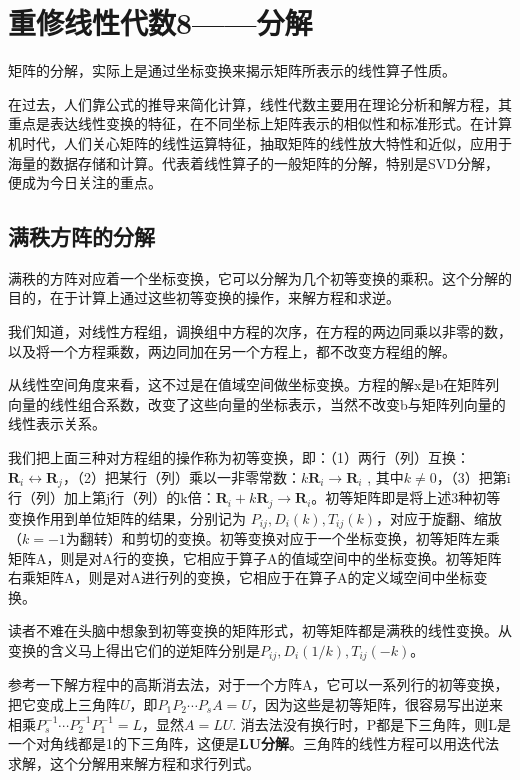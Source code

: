 \chapter{重修线性代数8——分解 }
矩阵的分解，实际上是通过坐标变换来揭示矩阵所表示的线性算子性质。

在过去，人们靠公式的推导来简化计算，线性代数主要用在理论分析和解方程，其重点是表达线性变换的特征，在不同坐标上矩阵表示的相似性和标准形式。在计算机时代，人们关心矩阵的线性运算特征，抽取矩阵的线性放大特性和近似，应用于海量的数据存储和计算。代表着线性算子的一般矩阵的分解，特别是SVD分解，便成为今日关注的重点。

\section{满秩方阵的分解}
满秩的方阵对应着一个坐标变换，它可以分解为几个初等变换的乘积。这个分解的目的，在于计算上通过这些初等变换的操作，来解方程和求逆。

我们知道，对线性方程组，调换组中方程的次序，在方程的两边同乘以非零的数，以及将一个方程乘数，两边同加在另一个方程上，都不改变方程组的解。

从线性空间角度来看，这不过是在值域空间做坐标变换。方程的解x是b在矩阵列向量的线性组合系数，改变了这些向量的坐标表示，当然不改变b与矩阵列向量的线性表示关系。

我们把上面三种对方程组的操作称为初等变换，即：（1）两行（列）互换：$ \mathbf{R}_{i} \leftrightarrow \mathbf{R}_{j} $，（2）把某行（列）乘以一非零常数：$ k\mathbf{R}_{i}\rightarrow \mathbf{R}_{i} $ , 其中$ k\neq0 $，（3）把第i行（列）加上第j行（列）的k倍：$ \mathbf{R}_{i} + k\mathbf{R}_{j}\rightarrow \mathbf{R}_{i} $。初等矩阵即是将上述3种初等变换作用到单位矩阵的结果，分别记为  $ P_{ij},D_{i}(k),T_{ij}(k) $，对应于旋翻、缩放（$ k=-1 $为翻转）和剪切的变换。初等变换对应于一个坐标变换，初等矩阵左乘矩阵A，则是对A行的变换，它相应于算子A的值域空间中的坐标变换。初等矩阵右乘矩阵A，则是对A进行列的变换，它相应于在算子A的定义域空间中坐标变换。

读者不难在头脑中想象到初等变换的矩阵形式，初等矩阵都是满秩的线性变换。从变换的含义马上得出它们的逆矩阵分别是$ P_{ij},D_{i}(1/k),T_{ij}(-k) $。

参考一下解方程中的高斯消去法，对于一个方阵A，它可以一系列行的初等变换，把它变成上三角阵$ U $，即$ P_{1}P_{2}\cdots P_{s}A=U $，因为这些是初等矩阵，很容易写出逆来相乘$ P_{s}^{-1}\cdots P_{2}^{-1}P_{1}^{-1}=L $，显然$ A = LU $. 消去法没有换行时，P都是下三角阵，则L是一个对角线都是1的下三角阵，这便是\textbf{LU分解}。三角阵的线性方程可以用迭代法求解，这个分解用来解方程和求行列式。

